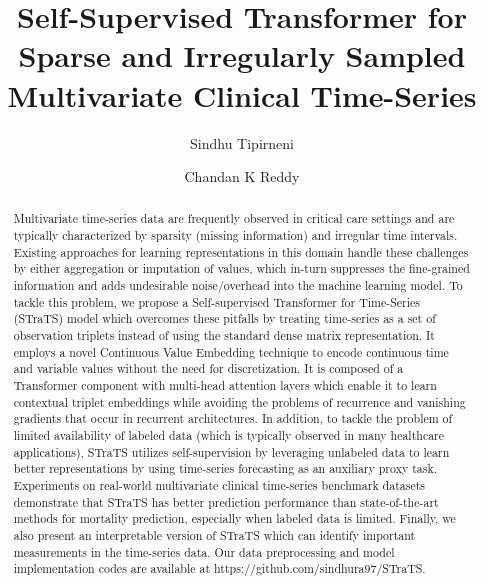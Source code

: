 \documentclass{acmart}
\title{Self-Supervised Transformer for Sparse and Irregularly Sampled Multivariate Clinical Time-Series}
\author{Sindhu Tipirneni}
\affiliation{%
  \institution{Virginia Tech}
  \city{Blacksburg, Virginia}
  \country{USA}
  \postcode{24061}
}
\author{Chandan K Reddy}
\affiliation{%
  \institution{Virginia Tech}
  \city{Arlington, Virginia}
  \country{USA}
  \postcode{22203}
}
\begin{document}
\begin{abstract}
Multivariate time-series data are frequently observed in critical care settings and are typically characterized by sparsity (missing information) and irregular time intervals. Existing approaches for learning representations in this domain handle these challenges by either aggregation or imputation of values, which in-turn suppresses the fine-grained information and adds undesirable noise/overhead into the machine learning model. To tackle this problem, we propose a Self-supervised Transformer for Time-Series (STraTS) model which overcomes these pitfalls by treating time-series as a set of observation triplets instead of using the standard dense matrix representation. It employs a novel Continuous Value Embedding technique to encode continuous time and variable values without the need for discretization. It is composed of a Transformer component with multi-head attention layers which enable it to learn contextual triplet embeddings while avoiding the problems of recurrence and vanishing gradients that occur in recurrent architectures. In addition, to tackle the problem of limited availability of labeled data (which is typically observed in many healthcare applications), STraTS utilizes self-supervision by leveraging unlabeled data to learn better representations by using time-series forecasting as an auxiliary proxy task. Experiments on real-world multivariate clinical time-series benchmark datasets demonstrate that STraTS has better prediction performance than state-of-the-art methods for mortality prediction, especially when labeled data is limited. Finally, we also present an interpretable version of STraTS which can identify important measurements in the time-series data. Our data preprocessing and model implementation codes are available at https://github.com/sindhura97/STraTS.
\end{abstract}
\end{document}
